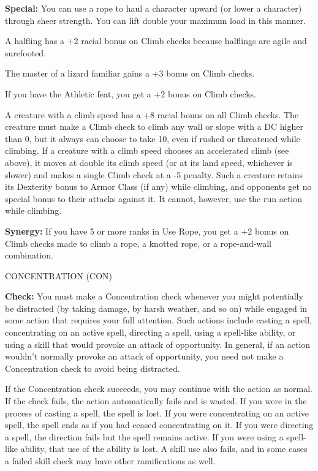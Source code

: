 \documentclass{article}
\begin{document}
\textbf{Special:} You can use a rope to haul a character upward (or lower a character) 
through sheer strength. You can lift double your maximum load in this manner.

A halfling has a +2 racial bonus on Climb checks because halflings are agile and 
surefooted.

The master of a lizard familiar gains a +3 bonus on Climb checks.

If you have the Athletic feat, you get a +2 bonus on Climb checks.

A creature with a climb speed has a +8 racial bonus on all Climb checks. The creature 
must make a Climb check to climb any wall or slope with a DC higher than 0, but 
it always can choose to take 10, even if rushed or threatened while climbing. If 
a creature with a climb speed chooses an accelerated climb (see above), it moves 
at double its climb speed (or at its land speed, whichever is slower) and makes 
a single Climb check at a -5 penalty. Such a creature retains its Dexterity bonus 
to Armor Class (if any) while climbing, and opponents get no special bonus to their 
attacks against it. It cannot, however, use the run action while climbing.

\textbf{Synergy:} If you have 5 or more ranks in Use Rope, you get a +2 bonus on 
Climb checks made to climb a rope, a knotted rope, or a rope-and-wall combination.

\vspace{12pt}
CONCENTRATION (CON)

\textbf{Check:} You must make a Concentration check whenever you might potentially 
be distracted (by taking damage, by harsh weather, and so on) while engaged in 
some action that requires your full attention. Such actions include casting a spell, 
concentrating on an active spell, directing a spell, using a spell-like ability, 
or using a skill that would provoke an attack of opportunity. In general, if an 
action wouldn't normally provoke an attack of opportunity, you need not make a 
Concentration check to avoid being distracted.

If the Concentration check succeeds, you may continue with the action as normal. 
If the check fails, the action automatically fails and is wasted. If you were in 
the process of casting a spell, the spell is lost. If you were concentrating on 
an active spell, the spell ends as if you had ceased concentrating on it. If you 
were directing a spell, the direction fails but the spell remains active. If you 
were using a spell-like ability, that use of the ability is lost. A skill use also 
fails, and in some cases a failed skill check may have other ramifications as well.
\end{document}
